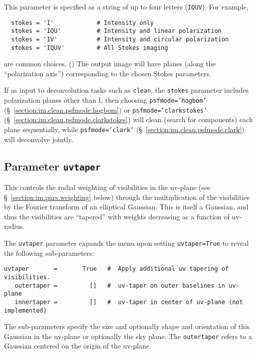 This parameter is specified as a string of up to four letters ({\tt IQUV}).
For example,
\small
\begin{verbatim}
  stokes = 'I'            # Intensity only
  stokes = 'IQU'          # Intensity and linear polarization
  stokes = 'IV'           # Intensity and circular polarization
  stokes = 'IQUV'         # All Stokes imaging
\end{verbatim}
\normalsize
are common choices. ()
The output image will have planes (along the ``polarization axis'')
corresponding to the chosen Stokes parameters.  

If as input to deconvolution tasks such as {\tt clean}, the {\tt stokes} parameter
includes polarization planes other than I, then choosing {\tt psfmode='hogbom'} 
(\S~\ref{section:im.clean.psfmode.hogbom}) or {\tt psfmode='clarkstokes'} 
(\S~\ref{section:im.clean.psfmode.clarkstokes}) will clean (search for
components) each plane sequentially, while {\tt psfmode='clark'} 
(\S~\ref{section:im.clean.psfmode.clark}) will deconvolve jointly.


\subsection{Parameter {\tt uvtaper} }
\label{section:im.pars.uvtaper}

This controls the radial weighting of visibilities in the uv-plane
(see \S~\ref{section:im.pars.weighting} below) through the multiplication
of the visibilities by the Fourier transform of an elliptical Gaussian.
This is itself a Gaussian, and thus the visibilities are ``tapered'' with
weights decreasing as a function of uv-radius.

The {\tt uvtaper} parameter expands the menu upon setting {\tt uvtaper=True} 
to reveal the following sub-parameters:
\small
\begin{verbatim}
uvtaper       =       True   #  Apply additional uv tapering of  visibilities.
   outertaper =         []   #  uv-taper on outer baselines in uv-plane
   innertaper =         []   #  uv-taper in center of uv-plane (not implemented)\end{verbatim}
\normalsize
The sub-parameters specify the size and optionally shape and
orientation of this Gaussian in the uv-plane or optionally the
sky plane.  The {\tt outertaper} refers to a Gaussian centered on 
the origin of the uv-plane.

